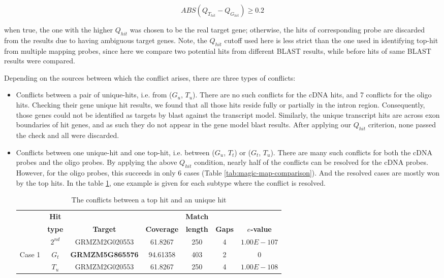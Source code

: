 \begin{equation}
ABS(Q_{T_{hit}}-Q_{G_{hit}}) \geq 0.2
\end{equation}

when true, the one with the higher $Q_{hit}$ was chosen to be the real target gene; otherwise, the hits of corresponding probe are discarded from the results due to having ambiguous target genes. Note, the $Q_{hit}$ cutoff used here is less strict than the one used in identifying top-hit from multiple mapping probes, since here we compare two potential hits from different BLAST results, while before hits of same BLAST results were compared.

Depending on the sources between which the conflict arises, there are three types of conflicts:

\begin{itemize}
\item Conflicts between a pair of unique-hits, i.e. from ($G_u$, $T_u$). There are no such conflicts for the cDNA hits, and 7 conflicts for the oligo hits. Checking their gene unique hit results, we found that all those hits reside fully or partially in the intron region. Consequently, those genes could not be identified as targets by blast against the transcript model. Similarly, the unique transcript hits are across exon boundaries of hit genes, and as such they do not appear in the gene model blast results. After applying our $Q_{hit}$ criterion, none passed the check and all  were discarded. 

\item  Conflicts between one unique-hit and one top-hit, i.e. between ($G_u$, $T_t$) or ($G_t$, $T_u$). There are many such conflicts for both the cDNA probes and the oligo probes. By applying the above $Q_{hit}$ condition, nearly half of the conflicts can be resolved for the cDNA probes. However, for the oligo probes, this succeeds in only 6 cases (Table \ref{tab:magic-map-comparison}). And the resolved cases are mostly won by the top hits. In the table \ref{tab:magic-conflict-topuniq}, one example is given for each subtype where the conflict is resolved. 

\begin{table}[b]
	\centering
	\begin{footnotesize}
	\caption{The conflicts between a top hit and an unique hit} 
	\label{tab:magic-conflict-topuniq}
	\begin{tabular}{@{}c|cccccc@{}}
	\toprule
	& \textbf{Hit} & & & \textbf{Match} & & \\
	& \textbf{type} & \textbf{Target} & \textbf{Coverage} & \textbf{length} 
	& \textbf{Gaps} & \textbf{$e$-value} \\ 
	\midrule
	& $2^{nd}$  & GRMZM2G020553 & 61.8267 & 250 & 4 & $1.00E-107$ \\ 
	Case 1 & \textbf{$G_t$} & \textbf{GRMZM5G865576} & 94.61358 & 403 & 2 & 0 
	\\ 
	& $T_u$ & GRMZM2G020553 & 61.8267 & 250 & 4 & $1.00E-108$ \\


\end{tabular}
\end{footnotesize}
\end{table}
\end{itemize}
